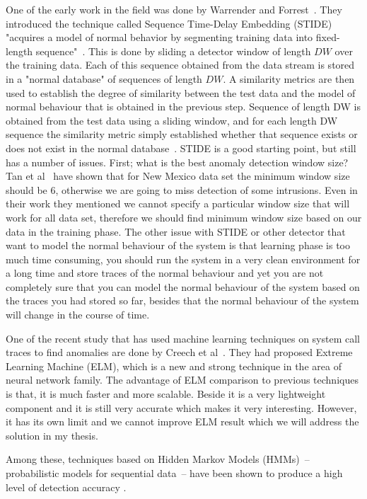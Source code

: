 One of the early work in the field was done by Warrender and Forrest~\cite{Warrender1999}. They introduced the technique called Sequence Time-Delay Embedding (STIDE)  "acquires a model of normal behavior by segmenting training data into fixed-length sequence"~\cite{Warrender1999}. This is done by sliding a detector window of length $DW$ over the training data. Each of this sequence obtained from the data stream is stored in a "normal database" of sequences of length $DW$. A similarity metrics are then used to establish the degree of similarity between the test data and the model of normal behaviour that is obtained in the previous step. Sequence of length DW is obtained from the test data using a sliding window, and for each length DW sequence the similarity metric simply established whether that sequence exists or does not exist in the normal database~\cite{Tan2002}.
STIDE is a good starting point, but still has a number of issues. First; what is the best anomaly detection window size? Tan et al~\cite{Tan2002} have shown that for New Mexico data set the minimum window size should be 6, otherwise we are going to miss detection of some intrusions. Even in their work they mentioned we cannot specify a particular window size that will work for all data set, therefore we should find minimum window size based on our data in the training phase.
The other issue with STIDE or other detector that want to model the normal behaviour of the system is that learning phase is too much time consuming, you should run the system in a very clean environment for a long time and store traces of the normal behaviour and yet you are not completely sure that you can model the normal behaviour of the system based on the traces you had stored so far, besides that the normal behaviour of the system will change in the course of time.

One of the recent study that has used machine learning techniques on system call traces to find anomalies are done by Creech et al~\cite{Creech2014}. They had proposed Extreme Learning Machine (ELM), which is a new and strong technique in the area of neural network family. The advantage of ELM comparison to previous techniques is that, it is much faster and more scalable. Beside it is a very lightweight component and it is still very accurate which makes it very interesting. However, it has its own limit and we cannot improve ELM result which we will address the solution in my thesis.


Among these, techniques based on Hidden Markov Models (HMMs)~-- probabilistic models for sequential data~-- have been shown to produce a high level of detection accuracy \cite{Du2004,Gao2002,Hoang2004,Hu2010,Wang2004,Warrender1999,Zhang2003,Khreich2009-ICC, Sultana2012, Murtaza2012}.

